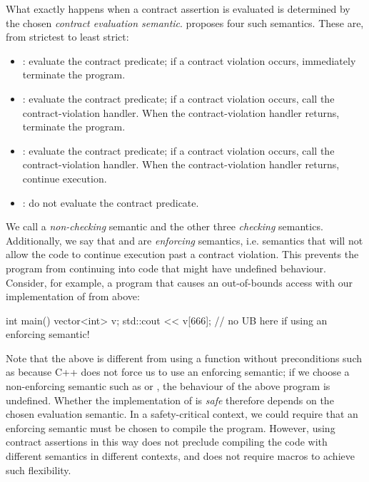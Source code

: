 What exactly happens when a contract assertion is evaluated is determined by the chosen \emph{contract evaluation semantic}. \cite{P2900R7} proposes four such semantics. These are, from strictest to least strict:
\begin{itemize}
\item {}: evaluate the contract predicate; if a contract violation occurs, immediately terminate the program.
\item {}: evaluate the contract predicate; if a contract violation occurs, call the contract-violation handler. When the contract-violation handler returns, terminate the program.
\item {}: evaluate the contract predicate; if a contract violation occurs, call the contract-violation handler. When the contract-violation handler returns, continue execution.
\item {}: do not evaluate the contract predicate.
\end{itemize}

We call  a \emph{non-checking} semantic and the other three \emph{checking} semantics. Additionally, we say that \mbox{} and  are \emph{enforcing} semantics, i.e. semantics that will not allow the code to continue execution past a contract violation. This prevents the program from continuing into code that might have undefined behaviour. Consider, for example, a program that causes an out-of-bounds access with our implementation of  from above:
\begin{codeblock}
int main() {
  vector<int> v;
  std::cout << v[666];    // no UB here if using an enforcing semantic!
}
\end{codeblock}
Note that the above is different from using a function without preconditions such as \mbox{} because C++ does not force us to use an enforcing semantic; if we choose a non-enforcing semantic such as  or , the behaviour of the above program is undefined. Whether the implementation of   is \emph{safe} therefore depends on the chosen evaluation semantic. In a safety-critical context, we could require that an enforcing semantic must be chosen to compile the program. However, using contract assertions in this way does not preclude compiling the code with different semantics in different contexts, and does not require macros to achieve such flexibility.


